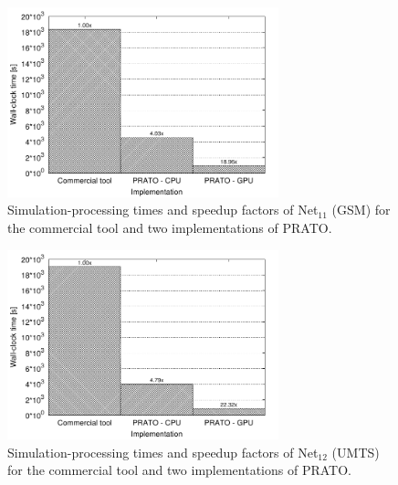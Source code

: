 \begin{figure}[h]
\centering

\includegraphics[width=0.7\textwidth]{08-real_network_planning/img/gsm_running_times}

\caption{Simulation-processing times and speedup factors of Net$_{11}$ (GSM)
for the commercial tool and two implementations of PRATO. \label{fig:08-Running_times-GSM}}
\end{figure}


\begin{figure}[h]
\centering

\includegraphics[width=0.7\textwidth]{08-real_network_planning/img/umts_running_times}

\caption{Simulation-processing times and speedup factors of Net$_{12}$ (UMTS)
for the commercial tool and two implementations of PRATO. \label{fig:08-Running_times-UMTS}}
\end{figure}



